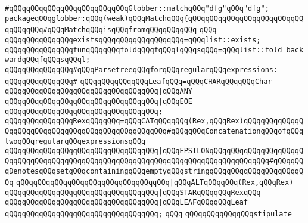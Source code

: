 \verb|#qQQqqQQqqQQqqQQqqQQqqQQqqQQqGlobber::matchqQQq"dfg"qQQq"dfg";|\newline
\newline
\newline
\newline
\verb|packageqQQqglobber:qQQq(weak)qQQqMatchqQQq{qQQqqQQqqQQqqQQqqQQqqQQqqQQqqQQqqQQq#qQQqMatchqQQqisqQQqfromqQQqqQQqqQQq|\newline
\verb|qQQq|\newline
\verb|qQQqqQQqqQQqqQQqexistsqQQqqQQqqQQqqQQqqQQq=qQQqlist::exists;|\newline
\verb|qQQqqQQqqQQqqQQqfunqQQqqQQqfoldqQQqfqQQqlqQQqsqQQq=qQQqlist::fold_backwardqQQqfqQQqsqQQql;|\newline
\newline
\newline
\verb|qQQqqQQqqQQqqQQq#qQQqParsetreeqQQqforqQQqregularqQQqexpressions:|\newline
\verb|qQQqqQQqqQQqqQQq#|\newline
\verb|qQQqqQQqqQQqqQQqLeafqQQq=qQQqCHARqQQqqQQqChar|\newline
\verb|qQQqqQQqqQQqqQQqqQQqqQQqqQQqqQQqqQQq|\verb#|qQQqANY#\newline
\verb|qQQqqQQqqQQqqQQqqQQqqQQqqQQqqQQqqQQq|\verb#|qQQqEOE#\newline
\verb|qQQqqQQqqQQqqQQqqQQqqQQqqQQqqQQqqQQq;|\newline
\verb|qQQqqQQqqQQqqQQqRexqQQqqQQq=qQQqCATqQQqqQQq(Rex,qQQqRex)qQQqqQQqqQQqqQQqqQQqqQQqqQQqqQQqqQQqqQQqqQQqqQQqqQQq#qQQqqQQqConcatenationqQQqofqQQqtwoqQQqregularqQQqexpressionsqQQq|\newline
\verb|qQQqqQQqqQQqqQQqqQQqqQQqqQQqqQQqqQQq|\verb#|qQQqEPSILONqQQqqQQqqQQqqQQqqQQqqQQqqQQqqQQqqQQqqQQqqQQqqQQqqQQqqQQqqQQqqQQqqQQqqQQqqQQqqQQqqQQq#\verb|#qQQqqQQqDenotesqQQqsetqQQqcontainingqQQqemptyqQQqstringqQQqqQQqqQQqqQQqqQQqqQQq|\newline
\verb|qQQqqQQqqQQqqQQqqQQqqQQqqQQqqQQqqQQq|\verb#|qQQqALTqQQqqQQq(Rex,qQQqRex)#\newline
\verb|qQQqqQQqqQQqqQQqqQQqqQQqqQQqqQQqqQQq|\verb#|qQQqSTARqQQqqQQqRexqQQq#\newline
\verb|qQQqqQQqqQQqqQQqqQQqqQQqqQQqqQQqqQQq|\verb#|qQQqLEAFqQQqqQQqLeaf#\newline
\verb|qQQqqQQqqQQqqQQqqQQqqQQqqQQqqQQqqQQq;|\newline
\verb|qQQq|\newline
\verb|qQQqqQQqqQQqqQQqstipulate|\newline
